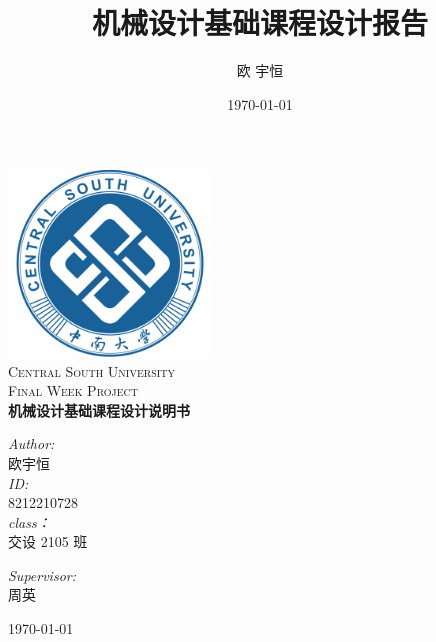 \documentclass[12pt]{ctexart}
\title{机械设计基础课程设计报告}
\author{欧 宇恒}
\date{\today}
\begin{document}
	

    
\begin{titlepage}

    \begin{center}
    \includegraphics[width=0.4\textwidth]{CSU.png}\\[1cm]    
    \textsc{\LARGE Central South University}\\[1.5cm]
    \textsc{\Large Final Week Project}\\[1.5cm]
    \textsc{\huge \bfseries 机械设计基础课程设计说明书}\\[1.5cm]
    \begin{minipage}{0.4\textwidth}
    \begin{flushleft} \large
    \emph{Author:}\\
    欧宇恒\\
    \emph{ID:}\\
    8212210728\\
    \emph{class：}\\
    交设 2105 班\\
    \end{flushleft}
    \end{minipage}
    \begin{minipage}{0.4\textwidth}
    \begin{flushright} \large
    \emph{Supervisor:} \\
    周英
    \end{flushright}
    \end{minipage}
    
    \vfill
    
    {\large \today}
    
    \end{center}
    
    \end{titlepage}
\end{document}
